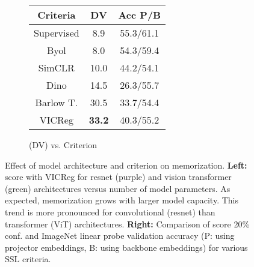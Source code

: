 \begin{figure}[ht]
\begin{minipage}[t]{0.48\textwidth}
\begin{subfigure}[b]{0.52\textwidth}
\begin{tabular}{|c|c|c|}
            Criteria & DV & Acc P/B \\
            \hline
            Supervised & 8.9 & 55.3/61.1\\
            \hline
            Byol\citep{grill2020byol} & 8.0& 54.3/59.4\\
            \hline
            SimCLR\citep{chen2020simclr} & 10.0 & 44.2/54.1\\
            \hline
            Dino\citep{Dino} & 14.5 & 26.3/55.7 \\
            \hline
            Barlow T.\citep{zbontar2021barlow} & 30.5 & 33.7/54.4\\
            \hline
            VICReg\citep{vicreg} & \textbf{33.2} & 40.3/55.2\\
            \hline
          \end{tabular}
          \vspace{1.3em}
          \caption{\dejavu (DV) vs. Criterion}
          \label{tab:dejavu vs. criterion}
    \end{subfigure}
    \vspace{-1.4em}
    \caption[Effect of model architecture and criterion on \dejavu memorization.]{
    Effect of model architecture and criterion on \dejavu memorization. 
    \textbf{Left:} \dejavu score with VICReg for resnet (purple) and vision transformer (green) architectures versus number of model parameters. As expected, memorization grows with larger model capacity. This trend is more pronounced for convolutional (resnet) than transformer (ViT) architectures. \textbf{Right:} Comparison of \dejavu score 20\% conf. and ImageNet linear probe validation accuracy (P: using projector embeddings, B: using backbone embeddings) for various SSL criteria. %
    }
    \end{minipage}
\end{figure}
